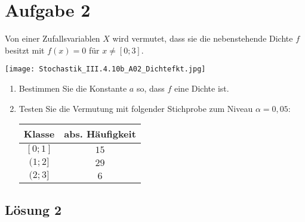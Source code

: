 \documentclass[main.tex]{subfiles}
\begin{document}
\section{Aufgabe 2}
Von einer Zufallsvariablen $X$ wird vermutet, dass sie die nebenstehende Dichte $f$ besitzt mit $f(x) = 0$ für $x \neq [0; 3]$.
\begin{center}
	\texttt{[image: Stochastik\_III.4.10b\_A02\_Dichtefkt.jpg]}
\end{center}
\begin{enumerate}
\item Bestimmen Sie die Konstante $a$ so, dass $f$ eine Dichte ist.
\item Testen Sie die Vermutung mit folgender Stichprobe zum Niveau $\alpha = 0,05$:
\begin{center}
	\begin{tabular}{c|c}
		Klasse & abs. Häufigkeit \\ \hline
		$[0; 1]$ & $15$ \\
		$(1; 2]$ & $29$ \\
		$(2; 3]$ & $6$
	\end{tabular}
\end{center}
\end{enumerate}

\subsection{Lösung 2}
\end{document}
